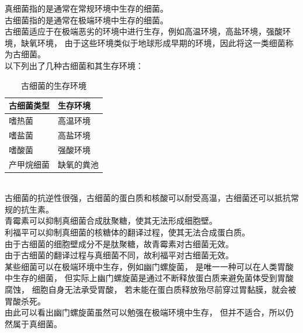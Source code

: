 \documentclass[UTF8]{ctexart}
\begin{document}
\newpage

    真细菌指的是通常在常规环境中生存的细菌。\\[3mm]
    古细菌指的是通常在极端环境中生存的细菌。\\[3mm]
    古细菌适应于在极端恶劣的环境中进行生存，例如高温环境，高盐环境，强酸环境，缺氧环境，
    由于这些环境类似于地球形成早期的环境，因此将这一类细菌称为古细菌。\\[3mm]
    以下列出了几种古细菌和其生存环境：
    \begin{table}[h]
        \begin{center}
            \begin{tabular}{l|l}
                \hline
                古细菌类型\qquad\qquad\qquad&生存环境\qquad\qquad\qquad\\ \hline
                嗜热菌&高温环境\\ \hline
                嗜盐菌&高盐环境\\ \hline
                嗜酸菌&强酸环境\\ \hline
                产甲烷细菌&缺氧的粪池\\ \hline
            \end{tabular}
            \caption{古细菌的生存环境}
        \end{center}
    \end{table}\\
    古细菌的抗逆性很强，古细菌的蛋白质和核酸可以耐受高温，古细菌还可以抵抗常规的抗生素。\\[3mm]
    青霉素可以抑制真细菌合成肽聚糖，使其无法形成细胞壁。\\[3mm]
    利福平可以抑制真细菌的核糖体的翻译过程，使其无法合成蛋白质。\\[3mm]
    由于古细菌的细胞壁成分不是肽聚糖，故青霉素对古细菌无效。\\[3mm]
    由于古细菌的翻译过程与真细菌不同，故利福平对古细菌无效。\\[6mm]
    某些细菌可以在极端环境中生存，例如幽门螺旋菌，
    是唯一一种可以在人类胃酸中生存的细菌，
    但实际上幽门螺旋菌是通过不断释放蛋白质来避免菌体受到胃酸腐蚀，
    细胞自身无法承受胃酸，
    若未能在蛋白质释放殆尽前穿过胃黏膜，就会被胃酸杀死。\\[3mm]
    由此可以看出幽门螺旋菌虽然可以勉强在极端环境中生存，
    但并不适合，所以仍然属于真细菌。\\
\end{document}
